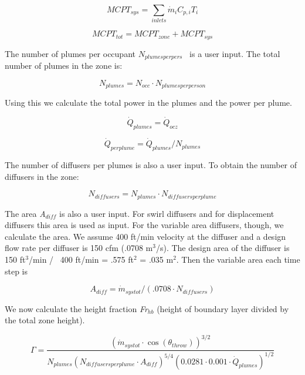 \begin{equation}
MCP{T_{sys}} = \sum\limits_{inlets} {{{\dot m}_i}} {C_{p,i}}{T_i}
\end{equation}

\begin{equation}
MCP{T_{tot}} = MCP{T_{zone}} + MCP{T_{sys}}
\end{equation}

The number of plumes per occupant \({N_{plumesperpers}}\) ~is a user input. The total number of plumes in the zone is:

\begin{equation}
{N_{plumes}} = {N_{occ}} \cdot {N_{plumesperperson}}
\end{equation}

Using this we calculate the total power in the plumes and the power per plume.

\begin{equation}
{\dot Q_{plumes}} = {\dot Q_{ocz}}
\end{equation}

\begin{equation}
{\dot Q_{perplume}} = {\dot Q_{plumes}}/{N_{plumes}}
\end{equation}

The number of diffusers per plumes is also a user input. To obtain the number of diffusers in the zone:

\begin{equation}
{N_{diffusers}} = {N_{plumes}}\cdot {N_{diffusersperplume}}
\end{equation}

The area \emph{A\(_{diff}\)} is also a user input. For swirl diffusers and for displacement diffusers this area is used as input. For the variable area diffusers, though, we calculate the area. We assume 400 ft/min velocity at the diffuser and a design flow rate per diffuser is 150 cfm (.0708 m\(^{3}\)/s). The design area of the diffuser is 150 ft\(^{3}\)/min /~ 400 ft/min = .575 ft\(^{2}\) = .035 m\(^{2}\). Then the variable area each time step is

\begin{equation}
{A_{diff}} = {\dot m_{systot}}/(.0708\cdot {N_{diffusers}})
\end{equation}

We now calculate the height fraction \emph{Fr\(_{hb}\)} (height of boundary layer divided by the total zone height).

\begin{equation}
\Gamma  = \frac{{{{({{\dot m}_{systot}}\cdot \cos ({\theta_{throw}}))}^{3/2}}}}{{{N_{plumes}}{{({N_{diffusersperplume}}\cdot {A_{diff}})}^{5/4}}{{(0.0281\cdot 0.001\cdot {{\dot Q}_{plumes}})}^{1/2}}}}
\end{equation}

